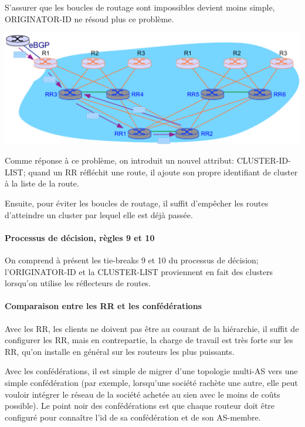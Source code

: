\documentclass{article}
\begin{document}
\begin{sffamily}
S'assurer que les boucles de routage sont impossibles devient moins
simple, ORIGINATOR-ID ne résoud plus ce problème.

\includegraphics[width=\textwidth]{fab_010.pdf}

Comme réponse à ce problème, on introduit un nouvel attribut:
CLUSTER-ID-LIST; quand un RR réfléchit une route, il ajoute son propre
identifiant de cluster à la liste de la route.

Ensuite, pour éviter les boucles de routage, il suffit d'empêcher les
routes d'atteindre un cluster par lequel elle est déjà passée.

\paragraph{Processus de décision, règles 9 et 10}

On comprend à présent les tie-breaks 9 et 10 du processus de décision;
l'ORIGINATOR-ID et la CLUSTER-LIST proviennent en fait des clusters
lorsqu'on utilise les réflecteurs de routes.

\paragraph{Comparaison entre les RR et les confédérations}

Avec les RR, les clients ne doivent pas être au courant de la
hiérarchie, il suffit de configurer les RR, mais en contrepartie, la
charge de travail est très forte sur les RR, qu'on installe en général
sur les routeurs les plus puissants.

Avec les confédérations, il est simple de migrer d'une topologie
multi-AS vers une simple confédération (par exemple, lorsqu'une
société rachète une autre, elle peut vouloir intégrer le réseau de la
société achetée au sien avec le moins de coûts possible). Le point
noir des confédérations est que chaque routeur doit être configuré
pour connaître l'id de sa confédération et de son AS-membre.


\end{sffamily}
\end{document}
